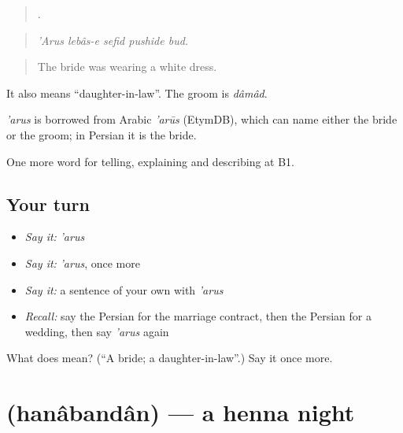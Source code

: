 \begin{quote}
    .
\end{quote}

\begin{quote}
\emph{'Arus lebâs-e sefid pushide bud.}
\end{quote}

\begin{quote}
The bride was wearing a white dress.
\end{quote}

It also means \textquotedblleft{}daughter-in-law\textquotedblright{}. The groom is \emph{dâmâd}.

\begin{cousinweb}
\emph{'arus} is borrowed from Arabic \emph{'arūs} (EtymDB), which can name either the bride or the groom; in Persian it is the bride.
\end{cousinweb}

\begin{grammarlens}[title={What you've built}]
One more word for telling, explaining and describing at B1.
\end{grammarlens}

\subsection*{Your turn}
\begin{itemize}
\raggedright
  \item \emph{Say it:} \emph{'arus}
  \item \emph{Say it:} \emph{'arus}, once more
  \item \emph{Say it:} a sentence of your own with \emph{'arus}
  \item \emph{Recall:} say the Persian for the marriage contract, then the Persian for a wedding, then say \emph{'arus} again
\end{itemize}

\begin{tcolorbox}[breakable,colback=teal!4,colframe=teal!35!black,title={Before you move on}]
What does  mean? (\textquotedblleft{}A bride; a daughter-in-law\textquotedblright{}.) Say it once more.
\end{tcolorbox}
\section[\texorpdfstring{\fa{حنابندان} (hanâbandân)}{حنابندان (hanâbandân)}]{ (hanâbandân) — a henna night}

